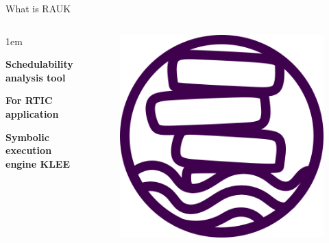 \begin{frame}{What is RAUK}
    \begin{columns}
        \begin{itemize-size}{1em}
            \item \textbf{Schedulability analysis tool}
            \item \textbf{For RTIC application}
            \item \textbf{Symbolic execution engine KLEE}
        \end{itemize-size}

        \begin{figure}
            \centering
            \includegraphics[scale=0.35]{pictures/RAUK.png}
        \end{figure}
    \end{columns}
\end{frame}
